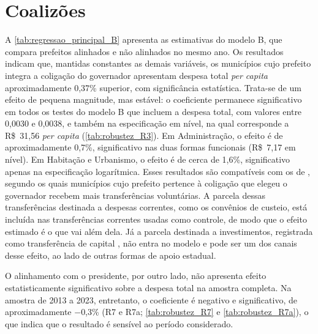 



\section{Coalizões}\label{sec:res_coalizoes}

A \autoref{tab:regressao_principal_B} apresenta as estimativas do modelo B, que compara prefeitos alinhados e não alinhados no mesmo ano. Os resultados indicam que, mantidas constantes as demais variáveis, os municípios cujo prefeito integra a coligação do governador apresentam despesa total \textit{per capita} aproximadamente 0,37\% superior, com significância estatística. Trata-se de um efeito de pequena magnitude, mas estável: o coeficiente permanece significativo em todos os testes do modelo B que incluem a despesa total, com valores entre 0,0030 e 0,0038, e também na especificação em nível, na qual corresponde a R\$~31,56 \textit{per capita} (\autoref{tab:robustez_R3}). Em Administração, o efeito é de aproximadamente 0,7\%, significativo nas duas formas funcionais (R\$~7,17 em nível). Em Habitação e Urbanismo, o efeito é de cerca de 1,6\%, significativo apenas na especificação logarítmica. Esses resultados são compatíveis com os de \textcite{ferreira2007}, segundo os quais municípios cujo prefeito pertence à coligação que elegeu o governador recebem mais transferências voluntárias. A parcela dessas transferências destinada a despesas correntes, como os convênios de custeio, está incluída nas transferências correntes usadas como controle, de modo que o efeito estimado é o que vai além dela. Já a parcela destinada a investimentos, registrada como transferência de capital \parencite[p.~49--50]{mcasp2024}, não entra no modelo e pode ser um dos canais desse efeito, ao lado de outras formas de apoio estadual.

O alinhamento com o presidente, por outro lado, não apresenta efeito estatisticamente significativo sobre a despesa total na amostra completa. Na amostra de 2013 a 2023, entretanto, o coeficiente é negativo e significativo, de aproximadamente $-$0,3\% (R7 e R7a; \autoref{tab:robustez_R7} e \autoref{tab:robustez_R7a}), o que indica que o resultado é sensível ao período considerado.

